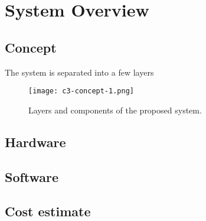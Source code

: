 \documentclass[../thesis.tex]{subfiles}
\begin{document}
\chapter{System Overview}


\section{Concept}

The system is separated into a few layers

\begin{figure}[h!]
  \texttt{[image: c3-concept-1.png]}
  \caption{Layers and components of the proposed system.}
  \label{fig:concept1}
\end{figure}


\section{Hardware}


\section{Software}


\section{Cost estimate}
\end{document}

